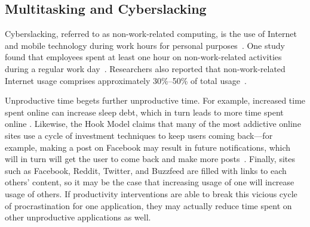 \subsection{Multitasking and Cyberslacking}
Cyberslacking, referred to as non-work-related computing, is the use of Internet and mobile technology during work hours for personal purposes~\cite{VITAK20111751,PEE2008120, Pamela2004, lim2002}. One study found that employees spent at least one hour on non-work-related activities during a regular work day~\cite{VITAK20111751}. Researchers also reported that non-work-related Internet usage comprises approximately 30\%--50\% of total usage~\cite{RESTUBOG2011247,JAMALUDDIN2015495}. %


Unproductive time begets further unproductive time. For example, increased time spent online can increase sleep debt, which in turn leads to more time spent online \cite{Mark:2016:SDS:2858036.2858437}. Likewise, the Hook Model claims that many of the most addictive online sites use a cycle of investment techniques to keep users coming back---for example, making a post on Facebook may result in future notifications, which will in turn will get the user to come back and make more posts~\cite{eyal2014hooked}. Finally, sites such as Facebook, Reddit, Twitter, and Buzzfeed are filled with links to each others' content, so it may be the case that increasing usage of one will increase usage of others. If productivity interventions are able to break this vicious cycle of procrastination for one application, they may actually reduce time spent on other unproductive applications as well.



